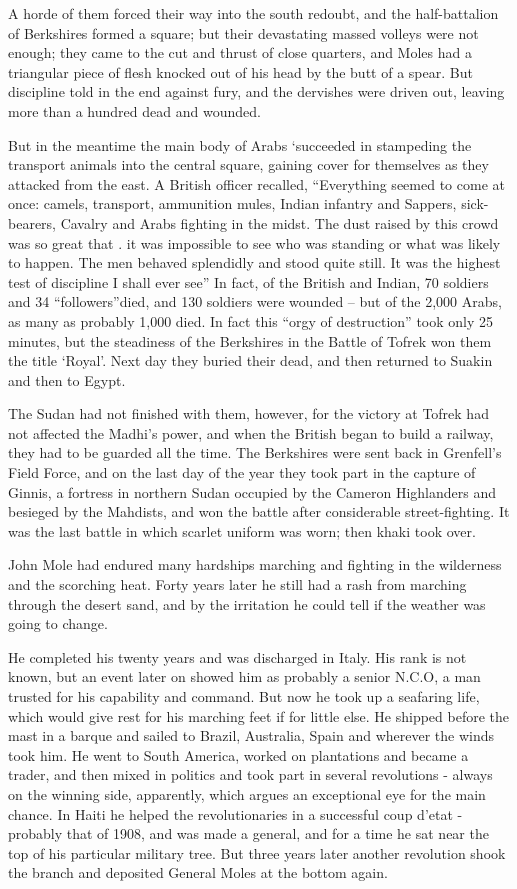 A horde of them forced their way into the south redoubt, and the half-battalion of Berkshires formed a square; but their devastating massed volleys were not enough; they came to the cut and thrust of close quarters, and Moles had a triangular piece of flesh knocked out of his head by the butt of a spear. But discipline told in the end against fury, and the dervishes were driven out, leaving more than a hundred dead and wounded.

But in the meantime the main body of Arabs ‘succeeded in stampeding the transport animals into the central square, gaining cover for themselves as they attacked from the east. A British officer recalled, “Everything seemed to come at once: camels, transport, ammunition mules, Indian infantry and Sappers, sick-bearers, Cavalry and Arabs fighting in the midst. The dust raised by this crowd was so great that . it was impossible to see who was standing or what was likely to happen. The men behaved splendidly and stood quite still. It was the highest test of discipline I shall ever see” In fact, of the British and Indian, 70 soldiers and 34 “followers”died, and 130 soldiers were wounded – but of the 2,000 Arabs, as many as probably 1,000 died. In fact this “orgy of destruction” took only 25 minutes, but the steadiness of the Berkshires in the Battle of Tofrek won them the title ‘Royal’. Next day they buried their dead, and then returned to Suakin and then to Egypt.

The Sudan had not finished with them, however, for the victory at Tofrek had not affected the Madhi’s power, and when the British began to build a railway, they had to be guarded all the time. The Berkshires were sent back in Grenfell’s Field Force, and on the last day of the year they took part in the capture of Ginnis, a fortress in northern Sudan occupied by the Cameron Highlanders and besieged by the Mahdists, and won the battle after considerable street-fighting. It was the last battle in which scarlet uniform was worn; then khaki took over. 

John Mole had endured many hardships marching and fighting in the wilderness and the scorching heat. Forty years later he still had a rash from marching through the desert sand, and by the irritation he could tell if the weather was going to change. 

He completed his twenty years and was discharged in Italy. His rank is not known, but an event later on showed him as probably a senior N.C.O, a man trusted for his capability and command. But now he took up a seafaring life, which would give rest for his marching feet if for little else. He shipped before the mast in a barque and sailed to Brazil, Australia, Spain and wherever the winds took him. He went to South America, worked on plantations and became a trader, and then mixed in politics and took part in several revolutions - always on the winning side, apparently, which argues an exceptional eye for the main chance. In Haiti he helped the revolutionaries in a successful coup d’etat -probably that of 1908, and was made a general, and for a time he sat near the top of his particular military tree. But three years later another revolution shook the branch and deposited General Moles at the bottom again.

